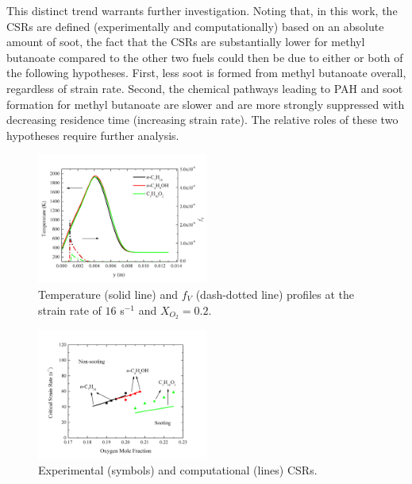 \documentclass[review,3p,times]{elsarticleUS}
\begin{document}
This distinct trend warrants further investigation.  Noting that, in this work, the CSRs are defined (experimentally and computationally) based on an absolute amount of soot, the fact that the CSRs are substantially lower for methyl butanoate compared to the other two fuels could then be due to either or both of the following hypotheses.  First, less soot is formed from methyl butanoate overall, regardless of strain rate.  Second, the chemical pathways leading to PAH and soot formation for methyl butanoate are slower and are more strongly suppressed with decreasing residence time (increasing strain rate).  The relative roles of these two hypotheses require further analysis.

\begin{figure}[t]
  \centering
  \scriptsize
  \vspace{-0.1in}
  \includegraphics[trim=4mm 8mm 4mm 20mm, clip=true, width=0.5\textwidth]{Thermal.png}
  \normalsize
  \vspace{-0.1in}
  \caption{Temperature (solid line) and $f_V$ (dash-dotted line) profiles at the strain rate of $16$ s$^{-1}$ and $X_{O_2}=0.2$.}
  \label{fig:thermal}
\end{figure}


\begin{figure}[t]
  \centering
  \scriptsize
  \vspace{0.5in}
  \includegraphics[trim=4mm 8mm 30mm 20mm, clip=true, width=0.5\textwidth]{Exp-Comp.png}
  \normalsize
  \vspace{-0.1in}
  \caption{Experimental (symbols) and computational (lines) CSRs.}
  \label{fig:Exp-Comp}
\end{figure}
\end{document}
